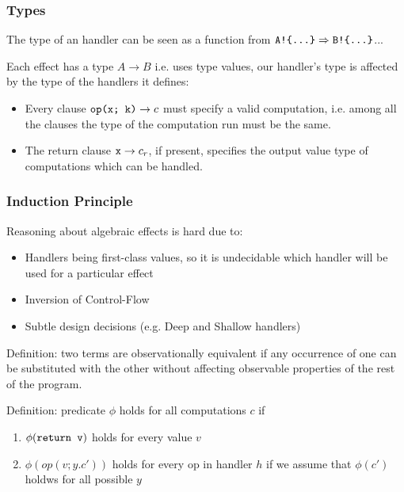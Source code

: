 \documentclass[t]{beamer}
\begin{document}
\begin{frame}[fragile]
	\frametitle{Types}
	
	The type of an handler can be seen as a function from $\verb|A!{...}| \Rightarrow \verb|B!{...}|$...
	
	Each effect has a type $A\rightarrow B$ i.e. uses \alert{type values}, our handler's type is affected by the type of the handlers it defines:
	
	\begin{itemize}
		\item Every clause $\verb|op(x; k)| \rightarrow c$ must specify a valid computation, i.e. among all the clauses the type of the computation run must be the same.
		\item The return clause $\verb|x| \rightarrow  c_r$, if present, specifies the output value type of computations which can be handled.
	\end{itemize}
	
\end{frame}
	
\begin{frame}[fragile]
	\frametitle{Induction Principle}
	Reasoning about algebraic effects is hard due to:
	\begin{itemize}
		\item Handlers being first-class values, so it is undecidable which handler will be used for a particular effect
		\item Inversion of Control-Flow
		\item Subtle design decisions (e.g. Deep and Shallow handlers) 
	\end{itemize}

	Definition: two terms are \alert{observationally} equivalent if any occurrence of one can be substituted with the other without affecting observable properties of the rest of the program.

	Definition: predicate $\phi$ holds for all computations $c$ if
	\begin{enumerate}
		\item $\phi(\verb|return v|)$ holds for every value $v$
		\item $\phi(op(v; y.c'))$ holds for every op in handler $h$ if we assume that $\phi(c')$ holdws for all \alert{possible} $y$ 
	\end{enumerate}
	
\end{frame}
\end{document}
